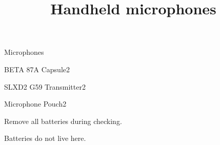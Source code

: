 \def\papersize{5}




\title{Handheld microphones}

\begin{checklist}{Microphones}
  \item{BETA 87A Capsule}{2}
  \item{SLXD2 G59 Transmitter}{2}
  \item{Microphone Pouch}{2}
\end{checklist}

Remove all batteries during checking.


Batteries do not live here.


